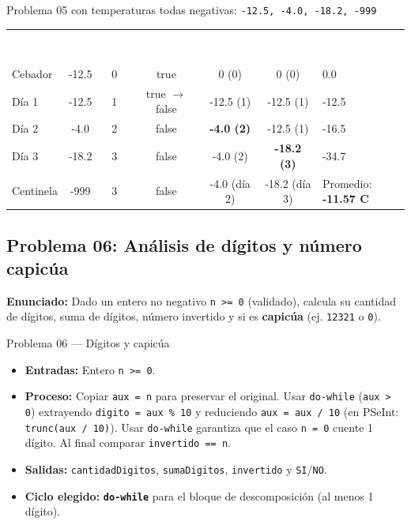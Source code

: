 \documentclass[11pt,letterpaper]{article}
\begin{document}
\begin{pruebaescritorio}{Problema 05 con temperaturas todas negativas: \texttt{-12.5, -4.0, -18.2, -999}}
\begin{center}
\footnotesize
\setlength{\tabcolsep}{4pt}
\renewcommand{\arraystretch}{1.15}
\begin{tabularx}{\linewidth}{l c c c c c X}
\rowcolor{AzulMarino}
\textcolor{white}{\textbf{Paso}} & \textcolor{white}{\texttt{temp}} & \textcolor{white}{\texttt{cont}} & \textcolor{white}{\texttt{esPrimero}} & \textcolor{white}{\texttt{mayor (día)}} & \textcolor{white}{\texttt{menor (día)}} & \textcolor{white}{\texttt{suma}} \\
Cebador & -12.5 & 0 & true & 0 (0) & 0 (0) & 0.0 \\
Día 1 & -12.5 & 1 & true $\rightarrow$ false & -12.5 (1) & -12.5 (1) & -12.5 \\
Día 2 & -4.0 & 2 & false & \textbf{-4.0 (2)} & -12.5 (1) & -16.5 \\
Día 3 & -18.2 & 3 & false & -4.0 (2) & \textbf{-18.2 (3)} & -34.7 \\
Centinela & -999 & 3 & false & -4.0 (día 2) & -18.2 (día 3) & Promedio: \textbf{-11.57 C} \\
\bottomrule
\end{tabularx}
\end{center}
\end{pruebaescritorio}

\subsection{Problema 06: Análisis de dígitos y número capicúa}

\textbf{Enunciado:} Dado un entero no negativo \texttt{n >= 0} (validado), calcula su cantidad de dígitos, suma de dígitos, número invertido y si es \textbf{capicúa} (ej. \texttt{12321} o \texttt{0}).

\begin{analisis}{Problema 06 --- Dígitos y capicúa}
\begin{itemize}
  \item \textbf{Entradas:} Entero \texttt{n >= 0}.
  \item \textbf{Proceso:} Copiar \texttt{aux = n} para preservar el original. Usar \texttt{do-while} (\texttt{aux > 0}) extrayendo \texttt{digito = aux \% 10} y reduciendo \texttt{aux = aux / 10} (en PSeInt: \texttt{trunc(aux / 10)}). Usar \texttt{do-while} garantiza que el caso \texttt{n = 0} cuente 1 dígito. Al final comparar \texttt{invertido == n}.
  \item \textbf{Salidas:} \texttt{cantidadDigitos}, \texttt{sumaDigitos}, \texttt{invertido} y \texttt{SI}/\texttt{NO}.
  \item \textbf{Ciclo elegido:} \textbf{\texttt{do-while}} para el bloque de descomposición (al menos 1 dígito).
\end{itemize}
\end{analisis}
\end{document}
